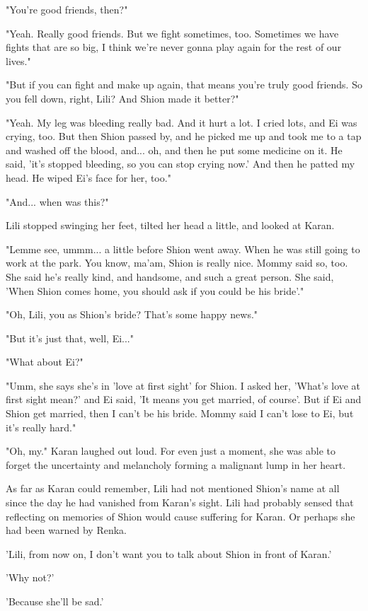 "You're good friends, then?"

"Yeah. Really good friends. But we fight sometimes, too. Sometimes we
have fights that are so big, I think we're never gonna play again for
the rest of our lives."

"But if you can fight and make up again, that means you're truly good
friends. So you fell down, right, Lili? And Shion made it better?"

"Yeah. My leg was bleeding really bad. And it hurt a lot. I cried lots,
and Ei was crying, too. But then Shion passed by, and he picked me up
and took me to a tap and washed off the blood, and... oh, and then he
put some medicine on it. He said, 'it's stopped bleeding, so you can
stop crying now.' And then he patted my head. He wiped Ei's face for
her, too."

"And... when was this?"

Lili stopped swinging her feet, tilted her head a little, and looked at
Karan.

"Lemme see, ummm... a little before Shion went away. When he was still
going to work at the park. You know, ma'am, Shion is really nice. Mommy
said so, too. She said he's really kind, and handsome, and such a great
person. She said, 'When Shion comes home, you should ask if you could be
his bride'."

"Oh, Lili, you as Shion's bride? That's some happy news."

"But it's just that, well, Ei..."

"What about Ei?"

"Umm, she says she's in 'love at first sight' for Shion. I asked her,
'What's love at first sight mean?' and Ei said, 'It means you get
married, of course'. But if Ei and Shion get married, then I can't be
his bride. Mommy said I can't lose to Ei, but it's really hard."

"Oh, my." Karan laughed out loud. For even just a moment, she was able
to forget the uncertainty and melancholy forming a malignant lump in her
heart.

As far as Karan could remember, Lili had not mentioned Shion's name at
all since the day he had vanished from Karan's sight. Lili had probably
sensed that reflecting on memories of Shion would cause suffering for
Karan. Or perhaps she had been warned by Renka.

'Lili, from now on, I don't want you to talk about Shion in front of
Karan.'

'Why not?'

'Because she'll be sad.'

